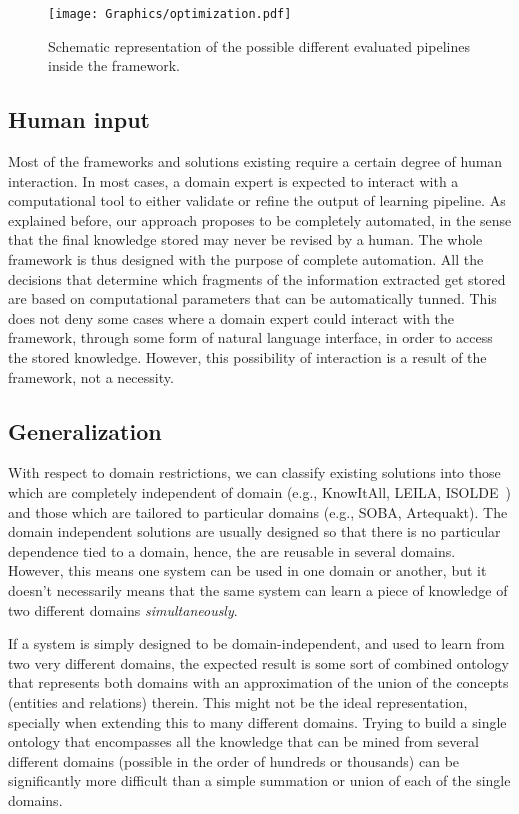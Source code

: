 \begin{figure}[htb]
    \begin{center}
        \texttt{[image: Graphics/optimization.pdf]}
        \caption{Schematic representation of the possible different evaluated pipelines inside the framework.}
        \label{fig:pipeline}
    \end{center}
\end{figure}

\subsection{Human input}

Most of the frameworks and solutions existing require a certain degree of human interaction.
In most cases, a domain expert is expected to interact with a computational tool to either validate or
refine the output of learning pipeline.
As explained before, our approach proposes to be completely automated,
in the sense that the final knowledge stored may never be revised by a human. The whole framework is thus
designed with the purpose of complete automation. All the decisions that determine which fragments
of the information extracted get stored are based on computational parameters that can
be automatically tunned.
This does not deny some cases where a domain expert could interact with the framework,
through some form of natural language interface, in order to access the stored knowledge.
However, this possibility of interaction is a result of the framework, not a necessity.

\subsection{Generalization}

With respect to domain restrictions, we can classify existing solutions into those which are
completely independent of domain (e.g., KnowItAll, LEILA, ISOLDE~\cite{isolde}) and those which are tailored
to particular domains (e.g., SOBA, Artequakt). The domain independent solutions are usually designed
so that there is no particular dependence tied to a domain, hence, the are reusable in several domains.
However, this means one system can be used in one domain or another, but it doesn't necessarily
means that the same system can learn a piece of knowledge of two different
domains \emph{simultaneously}.

If a system is simply designed to be domain-independent, and used to learn from two very different
domains, the expected result is some sort of combined ontology that represents both domains with
an approximation of the union of the concepts (entities and relations) therein.
This might not be the ideal representation, specially when extending this to many different domains.
Trying to build a single ontology that encompasses all the knowledge that can be mined from
several different domains (possible in the order of hundreds or thousands) can be significantly
more difficult than a simple summation or union of each of the single domains.

